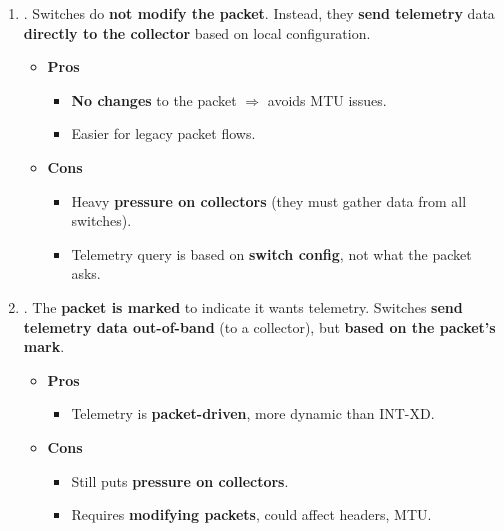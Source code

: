 \begin{enumerate}
    \item {}. Switches do \textbf{not modify the packet}. Instead, they \textbf{send telemetry} data \textbf{directly to the collector} based on local configuration.
    \begin{itemize}
        \item[\textcolor{Green3}{\faIcon{check-circle}}] \textcolor{Green3}{\textbf{Pros}}
        \begin{itemize}[label=\textcolor{Green3}{}]
            \item \textbf{No changes} to the packet $\Rightarrow$ avoids MTU issues.
            \item Easier for legacy packet flows.
        \end{itemize}

        \item[\textcolor{Red2}{\faIcon{times-circle}}] \textcolor{Red2}{\textbf{Cons}}
        \begin{itemize}[label=\textcolor{Red2}{}]
            \item Heavy \textbf{pressure on collectors} (they must gather data from all switches).
            \item Telemetry query is based on \textbf{switch config}, not what the packet asks.
        \end{itemize}
    \end{itemize}

    \item {}. The \textbf{packet is marked} to indicate it wants telemetry. Switches \textbf{send telemetry data out-of-band} (to a collector), but \textbf{based on the packet's mark}.
    \begin{itemize}
        \item[\textcolor{Green3}{\faIcon{check-circle}}] \textcolor{Green3}{\textbf{Pros}}
        \begin{itemize}[label=\textcolor{Green3}{}]
            \item Telemetry is \textbf{packet-driven}, more dynamic than INT-XD.
        \end{itemize}

        \item[\textcolor{Red2}{\faIcon{times-circle}}] \textcolor{Red2}{\textbf{Cons}}
        \begin{itemize}[label=\textcolor{Red2}{}]
            \item Still puts \textbf{pressure on collectors}.
            \item Requires \textbf{modifying packets}, could affect headers, MTU.
        \end{itemize}
    \end{itemize}


\end{enumerate}
